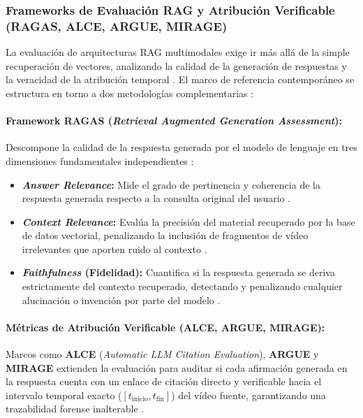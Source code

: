 \subsubsection{Frameworks de Evaluación RAG y Atribución Verificable (RAGAS, ALCE, ARGUE, MIRAGE)}
\label{subsubsec:frameworks_ragas_alce}

La evaluación de arquitecturas RAG multimodales exige ir más allá de la simple recuperación de vectores, analizando la calidad de la generación de respuestas y la veracidad de la atribución temporal \cite{eval_mrag2025, video_rac2025}. %
El marco de referencia contemporáneo se estructura en torno a dos metodologías complementarias \cite{eval_mrag2025, video_rac2025}: %

\paragraph{Framework RAGAS (\textit{Retrieval Augmented Generation Assessment}):}
Descompone la calidad de la respuesta generada por el modelo de lenguaje en tres dimensiones fundamentales independientes \cite{video_rac2025}: %
\begin{itemize}
    \item \textbf{\textit{Answer Relevance}:} Mide el grado de pertinencia y coherencia de la respuesta generada respecto a la consulta original del usuario \cite{video_rac2025}. %
    \item \textbf{\textit{Context Relevance}:} Evalúa la precisión del material recuperado por la base de datos vectorial, penalizando la inclusión de fragmentos de vídeo irrelevantes que aporten ruido al contexto \cite{video_rac2025}. %
    \item \textbf{\textit{Faithfulness} (Fidelidad):} Cuantifica si la respuesta generada se deriva estrictamente del contexto recuperado, detectando y penalizando cualquier alucinación o invención por parte del modelo \cite{video_rac2025}. %
\end{itemize}

\paragraph{Métricas de Atribución Verificable (ALCE, ARGUE, MIRAGE):}
Marcos como \textbf{ALCE} (\textit{Automatic LLM Citation Evaluation}), \textbf{ARGUE} y \textbf{MIRAGE} extienden la evaluación para auditar si cada afirmación generada en la respuesta cuenta con un enlace de citación directo y verificable hacia el intervalo temporal exacto ($[t_{\text{inicio}}, t_{\text{fin}}]$) del vídeo fuente, garantizando una trazabilidad forense inalterable \cite{eval_mrag2025}. %

